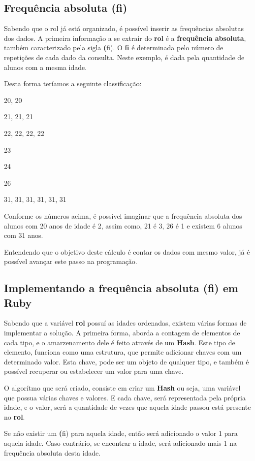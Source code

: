 \documentclass[espaco=simples,appendix=Name]{abnt}
\newcommand{\code}[1] {\textbf{#1}}
\begin{document}
\subsection { Frequência absoluta (fi) }

Sabendo que o rol já está organizado, é possível inserir  as frequências absolutas dos dados. A primeira informação a se extrair do \code{rol} é a \code{frequência absoluta}, também caracterizado pela sigla \code(fi). O \code{fi} é determinada pelo número de repetições de cada dado da consulta. Neste exemplo, é dada pela quantidade de alunos com a mesma idade.

Desta forma teríamos a seguinte classificação:

20, 20

21, 21, 21

22, 22, 22, 22

23

24

26

31, 31, 31, 31, 31, 31


Conforme os números acima, é possível imaginar que a frequência absoluta dos alunos com 20 anos de idade é 2, assim como, 21 é 3, 26 é 1 e existem 6 alunos com 31 anos.

Entendendo que o objetivo deste cálculo é contar os dados com mesmo valor, já é possível avançar este passo na programação.

\subsection { Implementando a frequência absoluta (fi) em Ruby }

Sabendo que a variável \code{rol} possuí as idades ordenadas, existem várias formas de implementar a solução. A primeira forma, aborda a contagem de elementos de cada tipo, e o amarzenamento dele é feito através de um \code{Hash}. Este tipo de elemento, funciona como uma estrutura, que permite adicionar chaves com um determinado valor. Esta chave, pode ser um objeto de qualquer tipo, e também é possível recuperar ou estabelecer um valor para uma chave.

O algorítmo que será criado, consiste em criar um \code{Hash} ou seja, uma variável que possua várias chaves e valores. E cada chave, será representada pela própria idade, e o valor, será a quantidade de vezes que aquela idade passou está presente no \code{rol}. 

Se não existir um \code(fi) para aquela idade, então será adicionado o valor 1 para aquela idade.
Caso contrário, se encontrar a idade, será adicionado mais 1 na frequência absoluta desta idade.
\end{document}
